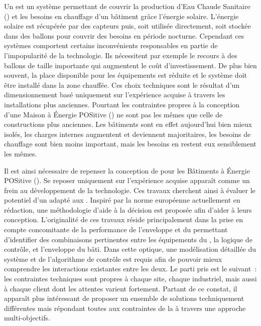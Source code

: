 Un  est un système permettant de couvrir la production d’Eau Chaude Sanitaire
() et les besoins en chauffage d’un bâtiment grâce l’énergie solaire. L’énergie
solaire est récupérée par des capteurs puis, soit utilisée directement, soit stockée dans
des ballons pour couvrir des besoins en période nocturne. Cependant ces systèmes
comportent certains inconvénients responsables en partie de l’impopularité de la
technologie. Ils nécessitent par exemple le recours à des ballons de taille importante
qui augmentent le coût d’investissement. De plus bien souvent, la place disponible pour
les équipements est réduite et le système doit être installé dans la zone chauffée. Ces
choix techniques sont le résultat d’un dimensionnement basé uniquement sur l’expérience
acquise à travers les installations plus anciennes. Pourtant les contraintes propres à la
conception d’une Maison à Énergie POSitive () ne sont pas les mêmes que celle
de constructions plus anciennes. Les bâtiments sont en effet aujourd’hui bien mieux
isolés, les charges internes augmentent et deviennent majoritaires, les besoins de
chauffage sont bien moins important, mais les besoins en  restent eux
sensiblement les mêmes.

Il est ainsi nécessaire de repenser la conception de  pour les Bâtiments à
Énergie POSitive (). Se reposer uniquement sur l’expérience acquise apparaît
comme un frein au développement de la technologie. Ces travaux cherchent ainsi à évaluer
le potentiel d’un  adapté aux . Inspiré par la norme européenne
 actuellement en rédaction, une méthodologie d’aide à la décision est
proposée afin d’aider à leurs conception. L’originalité de ces travaux réside
principalement dans la prise en compte concomitante de la performance de l’enveloppe et du
 permettant d’identifier des combinaisons pertinentes entre les équipements du
, la logique de contrôle, et l’enveloppe du bâti. Dans cette optique, une
modélisation détaillée du système et de l’algorithme de contrôle est requis afin de
pouvoir mieux comprendre les interactions existantes entre les deux. Le parti pris est le
suivant~: les contraintes techniques sont propres à chaque site, chaque industriel, mais
aussi à chaque client dont les attentes varient fortement. Partant de ce constat, il
apparaît plus intéressant de proposer un ensemble de solutions techniquement différentes
mais répondant toutes aux contraintes de la  à travers une approche
multi-objectifs.

